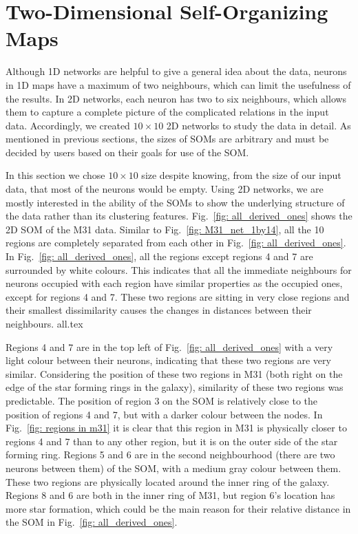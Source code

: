 \section{Two-Dimensional Self-Organizing Maps}
 \label{sec: 2d_cluster}
    Although 1D networks are helpful to give a general idea about the data, neurons in 1D maps have a maximum of two neighbours, which can limit the usefulness of the results.
    In 2D networks, each neuron has two to six neighbours, which allows them to capture a complete picture of the complicated relations in the input data.
    Accordingly, we created $10\times10$ 2D networks to study the data in detail.
    As mentioned in previous sections, the sizes of SOMs are arbitrary and must be decided by users based on their goals for use of the SOM.
    
    In this section we chose $10\times10$ size despite knowing, from the size of our input data, that most of the neurons would be empty.
    Using 2D networks, we are mostly interested in the ability of the SOMs to show the underlying structure of the data rather than its clustering features.
    Fig.~\ref{fig: all_derived_ones} shows the 2D SOM of the M31 data.
    Similar to Fig.~\ref{fig: M31_net_1by14}, all the 10 regions are completely separated from each other in Fig.~\ref{fig: all_derived_ones}.
    In Fig.~\ref{fig: all_derived_ones}, all the regions except regions 4 and 7 are surrounded by white colours.
    This indicates that all the immediate neighbours for neurons occupied with each region have similar properties as the occupied ones, except for regions 4 and 7.
    These two regions are sitting in very close regions and their smallest dissimilarity causes the changes in distances between their neighbours.
    {all.tex}
    
    Regions 4 and 7 are in the top left of Fig.~\ref{fig: all_derived_ones} with a very light colour between their neurons, indicating that these two regions are very similar.
    Considering the position of these two regions in M31 (both right on the edge of the star forming rings in the galaxy), similarity of these two regions was predictable.
    The position of region 3 on the SOM is relatively close to the position of regions 4 and 7, but with a darker colour between the nodes. 
    In Fig.~\ref{fig: regions in m31} it is clear that this region in M31 is physically closer to regions 4 and 7 than to any other region, but it is on the outer side of the star forming ring.
    Regions 5 and 6 are in the second neighbourhood (there are two neurons between them) of the SOM, with a medium gray colour between them.
    These two regions are physically located around the inner ring of the galaxy.
    Regions 8 and 6 are both in the inner ring of M31, but region 6's location has more star formation, which could be the main reason for their relative distance in the SOM in Fig.~\ref{fig: all_derived_ones}. 
    
